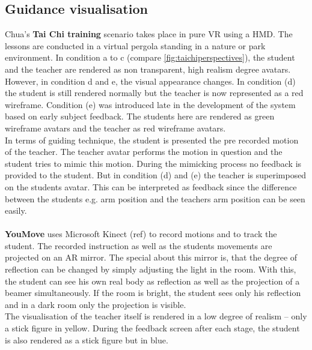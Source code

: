 \subsection{Guidance visualisation}
Chua's \textbf{Tai Chi training} scenario takes place in pure VR using a HMD. The lessons are conducted in a virtual pergola standing in a nature or park environment. In condition a to c (compare \ref{fig:taichiperspectives}), the student and the teacher are rendered as non transparent, high realism degree avatars. However, in condition d and e, the visual appearance changes. In condition (d) the student is still rendered normally but the teacher is now represented as a red wireframe. Condition (e) was introduced late in the development of the system based on early subject feedback. The students here are rendered as green wireframe avatars and the teacher as red wireframe avatars.\\
In terms of guiding technique, the student is presented the pre recorded motion of the teacher. The teacher avatar performs the motion in question and the student tries to mimic this motion. During the mimicking process no feedback is provided to the student. But in condition (d) and (e) the teacher is superimposed on the students avatar. This can be interpreted as feedback since the difference between the students e.g. arm position and the teachers arm position can be seen easily.\\ \\
\textbf{YouMove} uses Microsoft Kinect (\todo ref) to record motions and to track the student. The recorded instruction as well as the students movements are projected on an AR mirror. The special about this mirror is, that the degree of reflection can be changed by simply adjusting the light in the room. With this, the student can see his own real body as reflection as well as the projection of a beamer simultaneously. If the room is bright, the student sees only his reflection and in a dark room only the projection is visible.\\
The visualisation of the teacher itself is rendered in a low degree of realism \--- only a stick figure in yellow. During the feedback screen after each stage, the student is also rendered as a stick figure but in blue.\\
